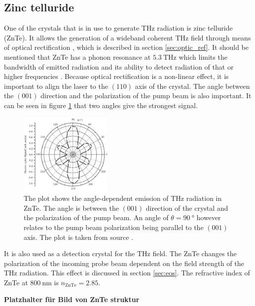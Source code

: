 \subsection{Zinc telluride}
\label{sec:znte}
One of the crystals that is in use to generate $\si{\tera\hertz}$ radiation is zinc telluride (ZnTe). 
It allows the generation of a wideband coherent $\si{\tera\hertz}$ field through means of optical rectification \cite{ZnTe_Nahata_Weling_1996}, which is described in section \ref{sec:optic_ref}.
It should be mentioned that ZnTe has a phonon resonance at $\SI{5.3}{\tera\hertz}$ which limits the bandwidth of emitted radiation and its ability to detect radiation of that or higher frequencies \cite{phonon_modes}.
Because optical rectification is a non-linear effect, it is important to align the laser to the $(110)$ axis of the crystal.
The angle between the $(001)$ direction and the polarization of the pump beam is also important.
It can be seen in figure \ref{fig:polarization_dependence_angle} that two angles give the strongest signal.
\begin{figure}
    \centering
    \includegraphics[width=0.4\textwidth]{refferenced_pic/degreedepenceZnTe.png}
    \caption{The plot shows the angle-dependent emission of $\si{\tera\hertz}$ radiation in ZnTe.
    The angle is between the $(001)$ direction of the crystal and the polarization of the pump beam. An angle of $\theta = \SI{90}{\degree}$ however relates to the pump beam polarization being parallel to the $(001)$ axis.
    The plot is taken from source \cite{selig}.}
    \label{fig:polarization_dependence_angle}
\end{figure}
It is also used as a detection crystal for the $\si{\tera\hertz}$ field.
The ZnTe changes the polarization of the incoming probe beam dependent on the field strength of the $\si{\tera\hertz}$ radiation.
This effect is discussed in section \ref{sec:eos}.
The refractive index of ZnTe at $\SI{800}{\nano\meter}$ is $n_\text{ZnTe} = 2.85$.

\textbf{Platzhalter für Bild von ZnTe struktur}

